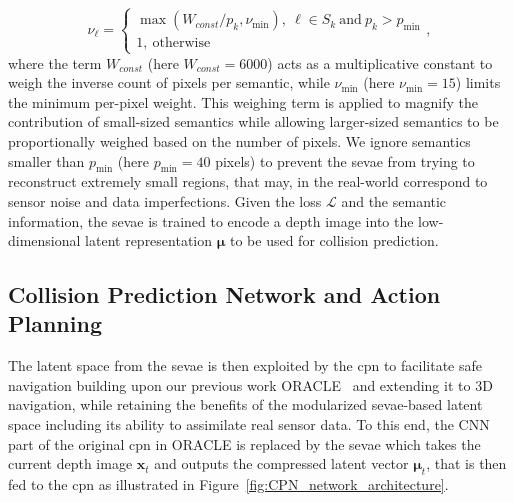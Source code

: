 \small
\begin{equation}
\nu_\ell = 
    \begin{cases}
    \max(W_{const}/p_k, \nu_{\min}),~ \ell \in S_k~\textrm{and}~p_k > p_{\min}\\
    1,~\textrm{otherwise}
    \end{cases},
\end{equation}
\normalsize
where the term $W_{const}$ (here $W_{const}=6000$) acts as a multiplicative constant to weigh the inverse count of pixels per semantic, while $\nu_{\min}$ (here $\nu_{\min}=15$) limits the minimum per-pixel weight. This weighing term is applied to magnify the contribution of small-sized semantics while allowing larger-sized semantics to be proportionally weighed based on the number of pixels. We ignore semantics smaller than $p_{\min}$ (here $p_{\min}=40$ pixels) to prevent the \ac{sevae} from trying to reconstruct extremely small regions, that may, in the real-world correspond to sensor noise and data imperfections. Given the loss $\mathcal{L}$ and the semantic information, the \ac{sevae} is trained to encode a depth image into the low-dimensional latent representation $\boldsymbol{\mu}$ to be used for collision prediction.


\subsection{Collision Prediction Network and Action Planning}\label{sec:collision_prediction_network}

The latent space from the \ac{sevae} is then exploited by the \ac{cpn} to facilitate safe navigation building upon our previous work ORACLE~\cite{ORACLE_ICRA2022} and extending it to $3$D navigation, while retaining the benefits of the modularized \ac{sevae}-based latent space including its ability to assimilate real sensor data. To this end, the CNN part of the original \ac{cpn} in ORACLE is replaced by the \ac{sevae} which takes the current depth image $\mathbf{x}_t$ and outputs the compressed latent vector $\boldsymbol{\mu}_t$, that is then fed to the \ac{cpn} as illustrated in Figure~\ref{fig:CPN_network_architecture}.

